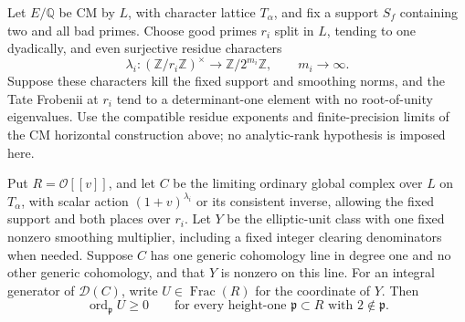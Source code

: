 \begin{lemma}
\label{cm:horizontal-nonnegative}
Let \(E/\mathbb Q\) be CM by \(L\), with character lattice
\(T_\alpha\), and fix a support \(S_f\) containing two and all bad
primes. Choose good primes \(r_i\) split in \(L\), tending to one
dyadically, and even surjective residue characters
\[
 \lambda_i:(\mathbb Z/r_i\mathbb Z)^\times
                      \longrightarrow\mathbb Z/2^{m_i}\mathbb Z,
 \qquad m_i\longrightarrow\infty.
\]
Suppose these characters kill the fixed support and smoothing norms,
and the Tate Frobenii at \(r_i\) tend to a determinant-one element
with no root-of-unity eigenvalues. Use the compatible residue exponents
and finite-precision limits of the CM horizontal construction above;
no analytic-rank hypothesis is imposed here.

Put \(R=\mathcal O[[v]]\), and let \(C\) be the limiting ordinary
global complex over \(L\) on \(T_\alpha\), with scalar action
\((1+v)^{\lambda_i}\) or its consistent inverse, allowing the fixed
support and both places over \(r_i\). Let \(Y\) be the elliptic-unit
class with one fixed nonzero smoothing multiplier, including a fixed
integer clearing denominators when needed. Suppose \(C\) has one generic cohomology
line in degree one and no other generic cohomology, and that \(Y\)
is nonzero on this line. For an integral generator of \(\mathcal D(C)\),
write \(U\in\operatorname{Frac}(R)\) for the coordinate of \(Y\).
Then
\[
 \operatorname{ord}_{\mathfrak p}U\ge0
 \qquad\text{for every height-one }\mathfrak p\subset R
                    \text{ with }2\notin\mathfrak p.
\]
\end{lemma}

